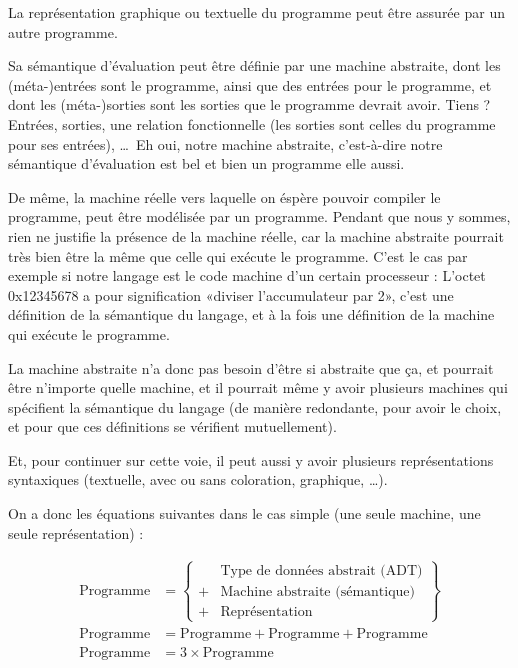 \documentclass{article}
\begin{document}
La représentation graphique ou textuelle du programme peut être assurée par un autre programme.

Sa sémantique d'évaluation peut être définie par une machine abstraite, dont les (méta-)entrées sont le programme, ainsi que des entrées pour le programme, et dont les (méta-)sorties sont les sorties que le programme devrait avoir. Tiens ? Entrées, sorties, une relation fonctionnelle (les sorties sont celles du programme pour ses entrées), \dots\ Eh oui, notre machine abstraite, c'est-à-dire notre sémantique d'évaluation est bel et bien un programme elle aussi.

De même, la machine réelle vers laquelle on éspère pouvoir compiler le programme, peut être modélisée par un programme. Pendant que nous y sommes, rien ne justifie la présence de la machine réelle, car la machine abstraite pourrait très bien être la même que celle qui exécute le programme. C'est le cas par exemple si notre langage est le code machine d'un certain processeur : L'octet 0x12345678 a pour signification «diviser l'accumulateur par 2», c'est une définition de la sémantique du langage, et à la fois une définition de la machine qui exécute le programme.

La machine abstraite n'a donc pas besoin d'être si abstraite que ça, et pourrait être n'importe quelle machine, et il pourrait même y avoir plusieurs machines qui spécifient la sémantique du langage (de manière redondante, pour avoir le choix, et pour que ces définitions se vérifient mutuellement).

Et, pour continuer sur cette voie, il peut aussi y avoir plusieurs représentations syntaxiques (textuelle, avec ou sans coloration, graphique, \dots).

On a donc les équations suivantes dans le cas simple (une seule machine, une seule représentation) :

\begin{align}
  \text{Programme} &= \left\lbrace
      \begin{array}{rl}
          &\text{Type de données abstrait (ADT)}\\
        + &\text{Machine abstraite (sémantique)}\\
        + &\text{Représentation}
      \end{array}
      \right\rbrace\\
  \text{Programme} &= \text{Programme} + \mathrm{Programme} + \mathrm{Programme}\\
  \text{Programme} &= 3 \times \text{Programme}
\end{align}
\end{document}
